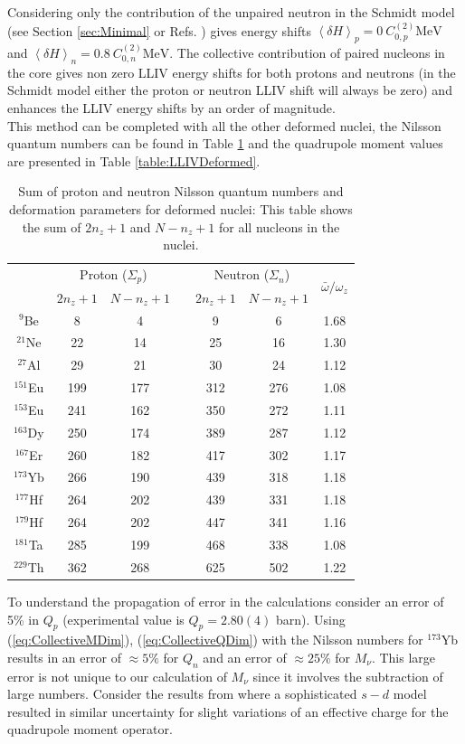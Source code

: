 \documentclass[8pt,a4paper, twoside]{report}
\begin{document}
Considering only the contribution of the unpaired neutron in the Schmidt model (see Section \ref{sec:Minimal} or Refs. \cite{Kostelecky1999,Flambaum2016}) gives energy shifts $\left<\delta H\right>_{p} = 0 \ C^{(2)}_{0,p} \text{MeV}$ and $\left<\delta H\right>_n = 0.8 \ C^{(2)}_{0,n} \text{MeV}$. The collective contribution of paired nucleons in the core gives non zero LLIV energy shifts for both protons and neutrons (in the Schmidt model either the proton or neutron LLIV shift will always be zero) and enhances the LLIV energy shifts by an order of magnitude.\\
This method can be completed with all the other deformed nuclei, the Nilsson quantum numbers can be found in Table \ref{table:NzNumbers} and the quadrupole moment values are presented in Table \ref{table:LLIVDeformed}.\\
\begin{table}[h!]
\center
\begin{tabular}{ccccccc}
\toprule
\toprule
 & \multicolumn{2}{c}{Proton ($\Sigma_p$)} & & \multicolumn{2}{c}{Neutron ($\Sigma_n$)} & \multirow{2}{*}{$\bar{\omega}/\omega_z$} \\
\cline{2-3} \cline{5-6}
 & $2n_z + 1$ & $N - n_z + 1$ & & $2n_z + 1$ & $N - n_z + 1$ &  \\
\midrule
$^{9}$Be   & 8   & 4  & & 9   & 6   & 1.68\\
$^{21}$Ne  & 22  & 14 & & 25  & 16  & 1.30\\
$^{27}$Al  & 29  & 21  &  & 30  & 24  & 1.12\\
$^{151}$Eu & 199 & 177 & & 312 & 276 & 1.08\\
$^{153}$Eu & 241 & 162 & & 350 & 272 & 1.11\\
$^{163}$Dy & 250 & 174 & & 389 & 287 & 1.12\\
$^{167}$Er & 260 & 182 & & 417 & 302 & 1.17\\
$^{173}$Yb & 266 & 190 & & 439 & 318 & 1.18\\
$^{177}$Hf & 264 & 202 & & 439 & 331 & 1.18\\
$^{179}$Hf & 264 & 202 & & 447 & 341 & 1.16\\
$^{181}$Ta & 285 & 199 & & 468 & 338 & 1.08\\
$^{229}$Th & 362 & 268 & & 625 & 502 & 1.22\\
\bottomrule
\bottomrule
\end{tabular}
\caption{Sum of proton and neutron Nilsson quantum numbers and deformation parameters for deformed nuclei: This table shows the sum of $2n_z + 1$ and $N - n_z + 1$ for all nucleons in the nuclei.}
\label{table:NzNumbers}
\end{table}
To understand the propagation of error in the calculations consider an error of 5\% in $Q_p$ (experimental value is $Q_p = 2.80(4)$ barn). Using (\ref{eq:CollectiveMDim}), (\ref{eq:CollectiveQDim}) with the Nilsson numbers for $^{173}$Yb results in an error of $\approx 5\%$ for  $Q_n$  and an error of $\approx 25\%$ for $M_{\nu}$. This large error is not unique to our calculation of $M_{\nu}$ since it involves the subtraction of large numbers. Consider the results from \cite{Brown2016} where a sophisticated $s-d$ model resulted in similar uncertainty for slight variations of an effective charge for the quadrupole moment operator.
\end{document}
